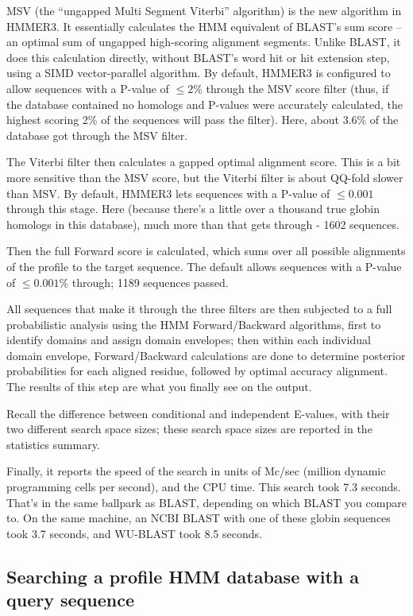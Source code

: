 MSV (the ``ungapped Multi Segment Viterbi'' algorithm) is the new
algorithm in HMMER3. It essentially calculates the HMM equivalent of
BLAST's sum score -- an optimal sum of ungapped high-scoring alignment
segments. Unlike BLAST, it does this calculation directly, without
BLAST's word hit or hit extension step, using a SIMD vector-parallel
algorithm. By default, HMMER3 is configured to allow sequences with a
P-value of $\leq 2$\% through the MSV score filter (thus, if the
database contained no homologs and P-values were accurately
calculated, the highest scoring 2\% of the sequences will pass the
filter). Here, about 3.6\% of the database got through the MSV filter.

The Viterbi filter then calculates a gapped optimal alignment score.
This is a bit more sensitive than the MSV score, but the Viterbi
filter is about QQ-fold slower than MSV. By default, HMMER3 lets
sequences with a P-value of $\leq 0.001$ through this stage. Here
(because there's a little over a thousand true globin homologs in this
database), much more than that gets through - 1602 sequences.

Then the full Forward score is calculated, which sums over all
possible alignments of the profile to the target sequence. The default
allows sequences with a P-value of $\leq 0.001$\% through; 1189
sequences passed.

All sequences that make it through the three filters are then
subjected to a full probabilistic analysis using the HMM
Forward/Backward algorithms, first to identify domains and assign
domain envelopes; then within each individual domain envelope,
Forward/Backward calculations are done to determine posterior
probabilities for each aligned residue, followed by optimal accuracy
alignment. The results of this step are what you finally see on the
output.

Recall the difference between conditional and independent E-values,
with their two different search space sizes; these search space sizes
are reported in the statistics summary. 

Finally, it reports the speed of the search in units of Mc/sec
(million dynamic programming cells per second), and the CPU time.
This search took 7.3 seconds. That's in the same ballpark as BLAST,
depending on which BLAST you compare to. On the same machine, an NCBI
BLAST with one of these globin sequences took 3.7 seconds, and
WU-BLAST took 8.5 seconds.



\subsection{Searching a profile HMM database with a query sequence}

